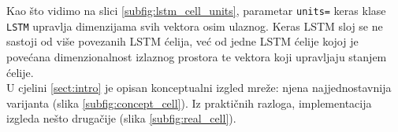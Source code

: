 \documentclass[conference]{IEEEtran}
\begin{document}
\begin{figure}[H]
{
}
\caption{ }
\end{figure}

Kao što vidimo na slici \ref{subfig:lstm_cell_units}, parametar \texttt{units=} keras klase \texttt{LSTM} upravlja dimenzijama svih vektora osim ulaznog. Keras LSTM sloj se ne sastoji od više povezanih LSTM ćelija, već od jedne LSTM ćelije kojoj je povećana dimenzionalnost izlaznog prostora te vektora koji upravljaju stanjem ćelije.
\ \\
U cjelini \ref{sect:intro} je opisan konceptualni izgled mreže: njena najjednostavnija varijanta (slika \ref{subfig:concept_cell}). Iz praktičnih razloga, implementacija izgleda nešto drugačije (slika \ref{subfig:real_cell}).
\end{document}
